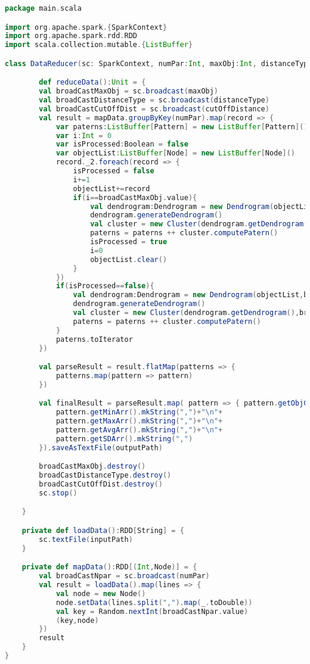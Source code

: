 \begin{lstlisting}[language=Scala, caption=DataReducer.scala]
package main.scala

import org.apache.spark.{SparkContext}
import org.apache.spark.rdd.RDD
import scala.collection.mutable.{ListBuffer}

class DataReducer(sc: SparkContext, numPar:Int, maxObj:Int, distanceType:Int, cutOffDistance:Double, inputPath: String, outputPath:String) extends Serializable {

        def reduceData():Unit = {
        val broadCastMaxObj = sc.broadcast(maxObj)
        val broadCastDistanceType = sc.broadcast(distanceType)
        val broadCastCutOffDist = sc.broadcast(cutOffDistance)
        val result = mapData.groupByKey(numPar).map(record => {
            var paterns:ListBuffer[Pattern] = new ListBuffer[Pattern]()
            var i:Int = 0
            var isProcessed:Boolean = false
            var objectList:ListBuffer[Node] = new ListBuffer[Node]()
            record._2.foreach(record => {
                isProcessed = false
                i+=1
                objectList+=record
                if(i==broadCastMaxObj.value){
                    val dendrogram:Dendrogram = new Dendrogram(objectList,broadCastDistanceType.value)
                    dendrogram.generateDendrogram()
                    val cluster = new Cluster(dendrogram.getDendrogram(),broadCastCutOffDist.value)
                    paterns = paterns ++ cluster.computePatern()
                    isProcessed = true
                    i=0
                    objectList.clear()
                }
            })
            if(isProcessed==false){
                val dendrogram:Dendrogram = new Dendrogram(objectList,broadCastDistanceType.value)
                dendrogram.generateDendrogram()
                val cluster = new Cluster(dendrogram.getDendrogram(),broadCastCutOffDist.value)
                paterns = paterns ++ cluster.computePatern()
            }
            paterns.toIterator
        })

        val parseResult = result.flatMap(patterns => {
            patterns.map(pattern => pattern)
        })

        val finalResult = parseResult.map( pattern => { pattern.getObjCount()+"\n"+
            pattern.getMinArr().mkString(",")+"\n"+
            pattern.getMaxArr().mkString(",")+"\n"+
            pattern.getAvgArr().mkString(",")+"\n"+
            pattern.getSDArr().mkString(",")
        }).saveAsTextFile(outputPath)

        broadCastMaxObj.destroy()
        broadCastDistanceType.destroy()
        broadCastCutOffDist.destroy()
        sc.stop()

    }

    private def loadData():RDD[String] = {
        sc.textFile(inputPath)
    }

    private def mapData():RDD[(Int,Node)] = {
        val broadCastNpar = sc.broadcast(numPar)
        val result = loadData().map(lines => {
            val node = new Node()
            node.setData(lines.split(",").map(_.toDouble))
            val key = Random.nextInt(broadCastNpar.value)
            (key,node)
        })
        result
    }
}
\end{lstlisting}


